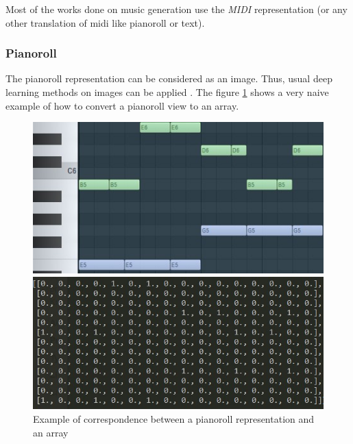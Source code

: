 \documentclass[12pt]{report}
\begin{document}
Most of the works done on music generation use the \textit{MIDI} representation (or any other translation of midi like pianoroll or text). \cite{chuan_modeling_nodate, hadjeres_deepbach:_2016, huang_counterpoint_2017, liang_automatic_2017, adiloglu_machine_2007, herremans_composing_2013, herremans_modeling_2017, boulanger-lewandowski_modeling_2012, lattner_imposing_2018, colombo_learning_2019, brunner_symbolic_2018, wu_hierarchical_2018}

\subsubsection{Pianoroll}
\label{sec:rw:pianoroll}

The pianoroll representation can be considered as an image.
Thus, usual deep learning methods on images can  be applied \cite{huang_counterpoint_2017, chuan_modeling_nodate, boulanger-lewandowski_modeling_2012, lattner_imposing_2018, donahue_adversarial_2019}.
The figure \ref{fig:pianoroll_to_array} shows a very naive example of how to convert a pianoroll view to an array.

\begin{figure}[H]
   \begin{minipage}{0.5\textwidth}
     \centering
     \includegraphics[width=.9\linewidth]{images/music/pianoroll/pianoroll_small.jpg}
   \end{minipage}\hfill
   \begin{minipage}{0.5\textwidth}
     \centering
     \includegraphics[width=\linewidth]{images/music/pianoroll/pianoroll_small_array.jpg}
   \end{minipage}
 \caption{Example of correspondence between a pianoroll representation and an array}
 \label{fig:pianoroll_to_array}
\end{figure}
\end{document}

